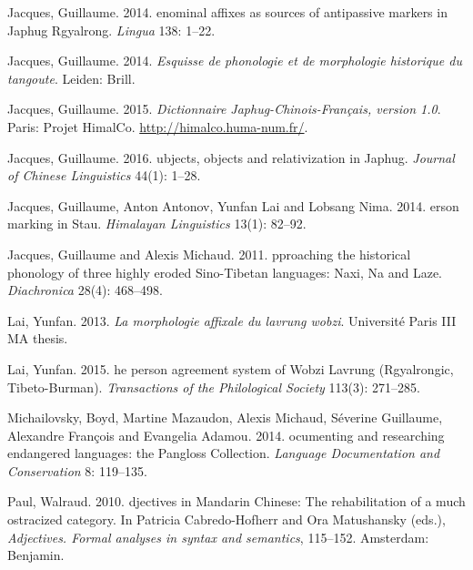 \documentclass[oneside,a4paper,11pt]{article}
\begin{document}
\begin{thebibliography}{39}
Jacques, Guillaume. 2014{}.
enominal affixes as sources of antipassive markers in {J}aphug
  {R}gyalrong.
\newblock \emph{Lingua} 138: 1--22.

Jacques, Guillaume. 2014{}.
\newblock \emph{{E}squisse de phonologie et de morphologie historique du
  tangoute}.
\newblock Leiden: Brill.

Jacques, Guillaume. 2015.
\newblock \emph{{D}ictionnaire {J}aphug-{C}hinois-{F}rançais, version 1.0}.
\newblock Paris: Projet HimalCo.
\newblock \urlprefix\url{http://himalco.huma-num.fr/}.

Jacques, Guillaume. 2016.
ubjects, objects and relativization in {J}aphug.
\newblock \emph{Journal of Chinese Linguistics} 44(1): 1--28.

Jacques, Guillaume, Anton Antonov, Yunfan Lai and Lobsang Nima. 2014.
erson marking in {S}tau.
\newblock \emph{Himalayan Linguistics} 13(1): 82--92.

Jacques, Guillaume and Alexis Michaud. 2011.
pproaching the historical phonology of three highly eroded
  {S}ino-{T}ibetan languages: {N}axi, {N}a and {L}aze.
\newblock \emph{Diachronica} 28(4): 468--498.

Lai, Yunfan. 2013.
\newblock \emph{{L}a morphologie affixale du lavrung wobzi}.
\newblock Université Paris III MA thesis.

Lai, Yunfan. 2015.
he person agreement system of {W}obzi {L}avrung ({R}gyalrongic,
  {T}ibeto-{B}urman).
\newblock \emph{Transactions of the Philological Society} 113(3): 271–285.

Michailovsky, Boyd, Martine Mazaudon, Alexis Michaud, Séverine Guillaume,
  Alexandre François and Evangelia Adamou. 2014.
ocumenting and researching endangered languages: the {P}angloss
  {C}ollection.
\newblock \emph{Language Documentation and Conservation} 8: 119–135.

Paul, Walraud. 2010.
djectives in {M}andarin {C}hinese: {T}he rehabilitation of a much
  ostracized category.
\newblock In Patricia Cabredo-Hofherr and Ora Matushansky (eds.),
  \emph{{A}djectives. {F}ormal analyses in syntax and semantics}, 115–152.
  Amsterdam: Benjamin.


\end{thebibliography}
\end{document}
